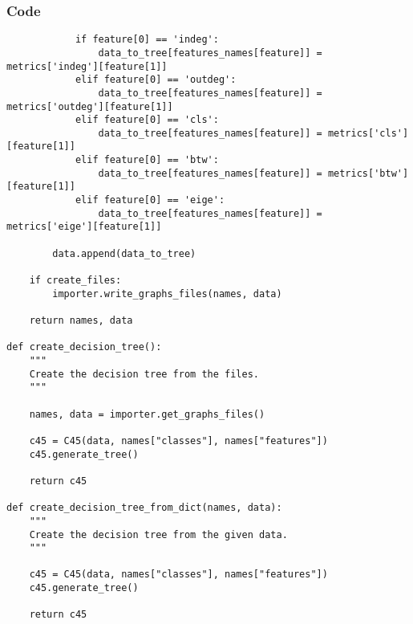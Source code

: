\documentclass{beamer}
\begin{document}
\begin{frame}[t, fragile]
    \frametitle{Code}
    \fontsize{3pt}{5pt}\selectfont
    \begin{verbatim}
            if feature[0] == 'indeg':
                data_to_tree[features_names[feature]] = metrics['indeg'][feature[1]]
            elif feature[0] == 'outdeg':
                data_to_tree[features_names[feature]] = metrics['outdeg'][feature[1]]
            elif feature[0] == 'cls':
                data_to_tree[features_names[feature]] = metrics['cls'][feature[1]]
            elif feature[0] == 'btw':
                data_to_tree[features_names[feature]] = metrics['btw'][feature[1]]
            elif feature[0] == 'eige':
                data_to_tree[features_names[feature]] = metrics['eige'][feature[1]]
        
        data.append(data_to_tree)

    if create_files:
        importer.write_graphs_files(names, data)
    
    return names, data
        
def create_decision_tree():
    """
    Create the decision tree from the files.
    """
    
    names, data = importer.get_graphs_files()

    c45 = C45(data, names["classes"], names["features"])
    c45.generate_tree()

    return c45

def create_decision_tree_from_dict(names, data):
    """
    Create the decision tree from the given data.
    """
    
    c45 = C45(data, names["classes"], names["features"])
    c45.generate_tree()

    return c45
    \end{verbatim}
\end{frame}

\end{document}
